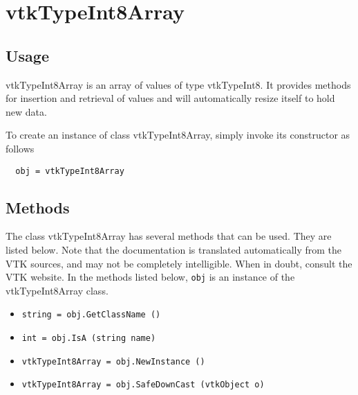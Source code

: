 \section{vtkTypeInt8Array}

\subsection{Usage}

 vtkTypeInt8Array is an array of values of type vtkTypeInt8.  It
 provides methods for insertion and retrieval of values and will
 automatically resize itself to hold new data.

To create an instance of class vtkTypeInt8Array, simply
invoke its constructor as follows
\begin{verbatim}
  obj = vtkTypeInt8Array
\end{verbatim}
\subsection{Methods}

The class vtkTypeInt8Array has several methods that can be used.
  They are listed below.
Note that the documentation is translated automatically from the VTK sources,
and may not be completely intelligible.  When in doubt, consult the VTK website.
In the methods listed below, \verb|obj| is an instance of the vtkTypeInt8Array class.
\begin{itemize}
\item  \verb|string = obj.GetClassName ()|

\item  \verb|int = obj.IsA (string name)|

\item  \verb|vtkTypeInt8Array = obj.NewInstance ()|

\item  \verb|vtkTypeInt8Array = obj.SafeDownCast (vtkObject o)|

\end{itemize}
